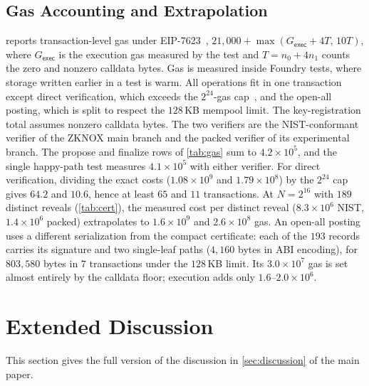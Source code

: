 \documentclass[10pt,journal,compsoc]{IEEEtran}
\theoremstyle{tplain}
\theoremstyle{tdef}
\theoremstyle{remark}
\begin{document}
\subsection{Gas Accounting and Extrapolation}\label{S-eval-gas}
 reports transaction-level gas under EIP-7623~\cite{eip7623}, $21{,}000+\max(G_{\mathsf{exec}}+4T,\,10T)$, where $G_{\mathsf{exec}}$ is the execution gas measured by the test and $T=n_0+4n_1$ counts the zero and nonzero calldata bytes. Gas is measured inside Foundry tests, where storage written earlier in a test is warm. All operations fit in one transaction except direct verification, which exceeds the $2^{24}$-gas cap~\cite{eip7825}, and the open-all posting, which is split to respect the $128$\,KB mempool limit. The key-registration total assumes nonzero calldata bytes. The two verifiers are the NIST-conformant verifier of the ZKNOX main branch and the packed verifier of its experimental branch. The propose and finalize rows of \cref{tab:gas} sum to $4.2\times10^{5}$, and the single happy-path test measures $4.1\times10^{5}$ with either verifier. For direct verification, dividing the exact costs ($1.08\times10^{9}$ and $1.79\times10^{8}$) by the $2^{24}$ cap gives $64.2$ and $10.6$, hence at least $65$ and $11$ transactions. At $N=2^{16}$ with $189$ distinct reveals (\cref{tab:cert}), the measured cost per distinct reveal ($8.3\times10^{6}$ NIST, $1.4\times10^{6}$ packed) extrapolates to $1.6\times10^{9}$ and $2.6\times10^{8}$ gas. An open-all posting uses a different serialization from the compact certificate: each of the $193$ records carries its signature and two single-leaf paths ($4{,}160$ bytes in ABI encoding), for $803{,}580$ bytes in $7$ transactions under the $128$\,KB limit. Its $3.0\times10^{7}$ gas is set almost entirely by the calldata floor; execution adds only $1.6$--$2.0\times10^{6}$.
\section{Extended Discussion}\label{S-discussion}

This section gives the full version of the discussion in \cref{sec:discussion} of the main paper.
\end{document}
